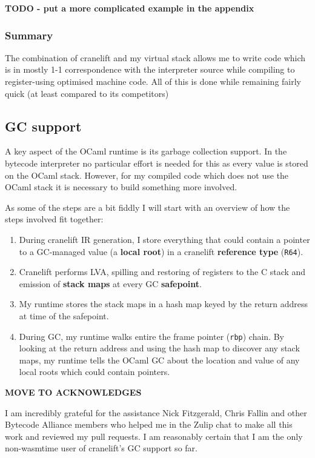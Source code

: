 \textbf{TODO - put a more complicated example in the appendix}

\subsubsection{Summary}

The combination of cranelift and my virtual stack allows me to write code which is in mostly 1-1
correspondence with the interpreter source while compiling to register-using optimised machine
code. All of this is done while remaining fairly quick (at least compared to its competitors)

\subsection{GC support} \label{gc-support}

A key aspect of the OCaml runtime is its garbage collection support. In the bytecode interpreter no
particular effort is needed for this as every value is stored on the OCaml stack. However, for my
compiled code which does not use the OCaml stack it is necessary to build something more involved.

As some of the steps are a bit fiddly I will start with an overview of how the steps involved fit
together:

\begin{enumerate}
      \item During cranelift IR generation, I store everything that could contain a pointer to a
            GC-managed value (a \textbf{local root}) in a cranelift \textbf{reference type}
            (\texttt{R64}).
      \item Cranelift performs LVA, spilling and restoring of registers to the C stack and emission
            of \textbf{stack maps} at every GC \textbf{safepoint}.
      \item My runtime stores the stack maps in a hash map keyed by the return address at time of
            the safepoint.
      \item During GC, my runtime walks entire the frame pointer (\texttt{rbp}) chain. By looking
            at the return address and using the hash map to discover any stack maps, my runtime
            tells the OCaml GC about the location and value of any local roots which could contain
            pointers.
\end{enumerate}

\textbf{MOVE TO ACKNOWLEDGES}

I am incredibly grateful for the assistance Nick Fitzgerald, Chris Fallin and other Bytecode
Alliance members who helped me in the Zulip chat to make all this work and reviewed my pull
requests. I am reasonably certain that I am the only non-wasmtime user of cranelift's GC support so
far.

